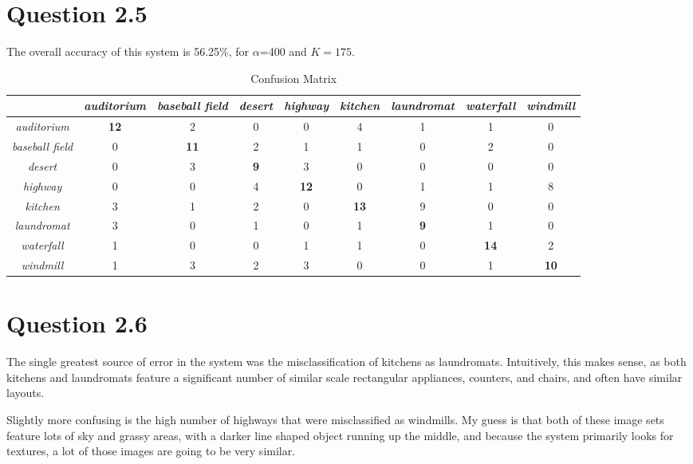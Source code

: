 \documentclass[11pt]{article}
\begin{document}
\section{Question 2.5}
 The overall accuracy of this system is 56.25\%, for $\alpha$=400 and $K=175$. 
\begin{table}[h!]
\centering
\caption{Confusion Matrix }
\label{conf}
\begin{tabular}{|c|c|c|c|c|c|c|c|c|}\hline
&\textit{auditorium} & \textit{baseball field} & \textit{desert} & \textit{highway} & \textit{kitchen} & \textit{laundromat} & \textit{waterfall} & \textit{windmill} \\ \hline
\textit{auditorium}     & \textbf{12} &  2  &  0 &   0 &   4 &   1 &   1 &   0 \\ \hline
\textit{baseball field} & 0   &\textbf{11}  & 2  &  1  &  1  &  0  &  2  &  0  \\ \hline
\textit{desert}         & 0   & 3   & \textbf{9} &  3  &  0  &  0  &  0  &  0  \\ \hline
\textit{highway}        & 0   & 0   & 4  &\textbf{ 12} &  0  &  1  &  1  &  8  \\ \hline
\textit{kitchen}        & 3   & 1   & 2  &  0  & \textbf{13} &  9  &  0  &  0  \\ \hline
\textit{laundromat}     & 3   & 0   & 1  &  0  &  1  &  \textbf{9}  &  1  &  0  \\ \hline
\textit{waterfall}      & 1   & 0   & 0  &  1  &  1  &  0  &\textbf{14}  &  2  \\ \hline
\textit{windmill}       & 1   & 3   & 2  &  3  &  0  &  0  &  1  & \textbf{10} \\ \hline 
\end{tabular}
\end{table}
\section{Question 2.6}
The single greatest source of error in the system was the misclassification of kitchens as laundromats.
Intuitively, this makes sense, as both kitchens and laundromats feature a significant number of 
similar scale rectangular appliances, counters, and chairs, and often have similar layouts. 

Slightly more confusing is the high number of highways that were misclassified as windmills.
My guess is that both of these image sets feature lots of sky and grassy areas, with a darker
line shaped object running up the middle, and because the system primarily looks for textures,
a lot of those images are going to be very similar. 
\end{document}
